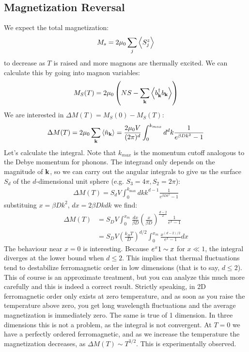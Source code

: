 \subsection{Magnetization Reversal}
We expect the total magnetization:
\begin{align*}
    M_s = 2\mu_0 \sum_j \left< S_j^z \right>
\end{align*}
to decrease as $T$ is raised and more magnons are thermally excited. We can calculate this by going into magnon variables:
\begin{equation}
    M_S(T) = 2\mu_0 \left(NS - \sum_{\mathbf{k}}\left< b^\dagger_{\mathbf{k}}b_{\mathbf{k}} \right>\right)
\end{equation}
We are interested in $\Delta M(T) = M_S(0) - M_S(T)$:
\begin{equation}
    \Delta M(T) = 2 \mu_0\sum_{\mathbf{k}}\left< \hat{n}_{\mathbf{k}} \right> = \frac{2\mu_0 V}{(2\pi)^d}\int_0^{k_{max}} d^dk \frac{1}{e^{\beta Dk^2} - 1}
\end{equation}
Let's calculate the integral. Note that $k_{max}$ is the momentum cutoff analogous to the Debye momentum for phonons. The integrand only depends on the magnitude of $\mathbf{k}$, so we can carry out the angular integrals to give us the surface $S_d$ of the $d$-dimensional unit sphere (e.g. $S_3 = 4\pi, S_2 = 2\pi$):
\begin{align*}
    \Delta M(T) = S_d V \int_0^{k_{\text{max}}} dk k^{d-1}\frac{1}{e^{\beta Dk^2} - 1}
\end{align*} 
substituing $x = \beta Dk^2$, $dx = 2\beta Dk dk$ we find:
\begin{equation}
    \begin{split}
        \Delta M(T) &= S_D V \int_0^{x_m} \frac{dx}{\beta D}\left(\frac{x}{\beta D}\right)^{\frac{d-2}{2}}\frac{1}{e^x - 1}
        \\ &= S_D V \left(\frac{k_B T}{D}\right)^{d/2}\int_0^{x_m}\frac{x^{(d-2)/2}}{e^x - 1}dx
    \end{split}
\end{equation}
The behaviour near $x = 0$ is interesting. Because $e^x \- 1 \sim x$ for $x \ll 1$, the integral diverges at the lower bound when $d \leq 2$. This implies that thermal fluctuations tend to destabilize ferromagnetic order in low dimensions (that is to say, $d \leq 2$). This of course is an approximate treatment, but you can analyze this much more carefully and this is indeed a correct result. Strictly speaking, in 2D ferromagnetic order only exists at zero temperature, and as soon as you raise the temperature above zero, you get long wavelength fluctuations and the average magnetization is immediately zero. The same is true of 1 dimension. In three dimensions this is not a problem, as the integral is not convergent. At $T = 0$ we have a perfectly ordered ferromagnetic, and as we increase the temperature the magnetization decreases, as $\Delta M(T) \sim T^{3/2}$. This is experimentally observed.

